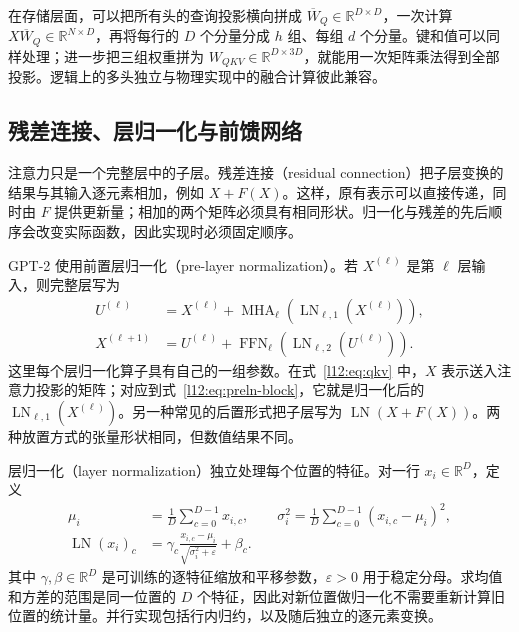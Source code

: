 在存储层面，可以把所有头的查询投影横向拼成 $\overline W_Q\in\mathbb{R}^{D\times D}$，一次计算 $X\overline W_Q\in\mathbb{R}^{N\times D}$，再将每行的 $D$ 个分量分成 $h$ 组、每组 $d$ 个分量。键和值可以同样处理；进一步把三组权重拼为 $W_{QKV}\in\mathbb{R}^{D\times3D}$，就能用一次矩阵乘法得到全部投影。逻辑上的多头独立与物理实现中的融合计算彼此兼容。

\subsection{残差连接、层归一化与前馈网络}

注意力只是一个完整层中的子层。残差连接（residual connection）把子层变换的结果与其输入逐元素相加，例如 $X+F(X)$。这样，原有表示可以直接传递，同时由 $F$ 提供更新量；相加的两个矩阵必须具有相同形状。归一化与残差的先后顺序会改变实际函数，因此实现时必须固定顺序。

GPT-2 使用前置层归一化（pre-layer normalization）。若 $X^{(\ell)}$ 是第 $\ell$ 层输入，则完整层写为
\begin{equation}
\begin{aligned}
  U^{(\ell)}&=X^{(\ell)}+
     \operatorname{MHA}_{\ell}\!\left(\operatorname{LN}_{\ell,1}(X^{(\ell)})\right),\\
  X^{(\ell+1)}&=U^{(\ell)}+
     \operatorname{FFN}_{\ell}\!\left(\operatorname{LN}_{\ell,2}(U^{(\ell)})\right).
\end{aligned}
\label{l12:eq:preln-block}
\end{equation}
这里每个层归一化算子具有自己的一组参数。在式~\eqref{l12:eq:qkv} 中，$X$ 表示送入注意力投影的矩阵；对应到式~\eqref{l12:eq:preln-block}，它就是归一化后的 $\operatorname{LN}_{\ell,1}(X^{(\ell)})$。另一种常见的后置形式把子层写为 $\operatorname{LN}(X+F(X))$。两种放置方式的张量形状相同，但数值结果不同。

层归一化（layer normalization）独立处理每个位置的特征。对一行 $x_i\in\mathbb{R}^D$，定义
\begin{equation}
\begin{aligned}
  \mu_i&=\frac{1}{D}\sum_{c=0}^{D-1}x_{i,c},\qquad
  \sigma_i^2=\frac{1}{D}\sum_{c=0}^{D-1}(x_{i,c}-\mu_i)^2,\\
  \operatorname{LN}(x_i)_c&=\gamma_c
  \frac{x_{i,c}-\mu_i}{\sqrt{\sigma_i^2+\varepsilon}}+\beta_c.
\end{aligned}
\label{l12:eq:layernorm}
\end{equation}
其中 $\gamma,\beta\in\mathbb{R}^D$ 是可训练的逐特征缩放和平移参数，$\varepsilon>0$ 用于稳定分母。求均值和方差的范围是同一位置的 $D$ 个特征，因此对新位置做归一化不需要重新计算旧位置的统计量。并行实现包括行内归约，以及随后独立的逐元素变换。

